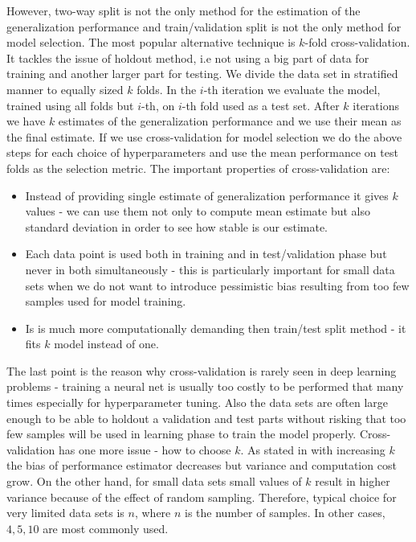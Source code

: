 \documentclass[shortabstract, english, mgr]{iithesis}
\begin{document}
However, two-way split is not the only method for the estimation of the generalization performance and train/validation split is not the only method for model selection. The most popular alternative technique is $k$-fold cross-validation. It tackles the issue of holdout method, i.e not using a big part of data for training and another larger part for testing. We divide the data set in stratified manner to equally sized $k$ folds. In the $i$-th iteration we evaluate the model, trained using all folds but $i$-th, on $i$-th fold used as a test set. After $k$ iterations we have $k$ estimates of the generalization performance and we use their mean as the final estimate. If we use cross-validation for model selection we do the above steps for each choice of hyperparameters and use the mean performance on test folds as the selection metric. The important properties of cross-validation are:
\begin{itemize}
    \item Instead of providing single estimate of generalization performance it gives $k$ values - we can use them not only to compute mean estimate but also standard deviation in order to see how stable is our estimate.
    \item Each data point is used both in training and in test/validation phase but never in both simultaneously - this is particularly important for small data sets when we do not want to introduce pessimistic bias resulting from too few samples used for model training.
    \item Is is much more computationally demanding then train/test split method - it fits $k$ model instead of one.
\end{itemize}
The last point is the reason why cross-validation is rarely seen in deep learning problems - training a neural net is usually too costly to be performed that many times especially for hyperparameter tuning. Also the data sets are often large enough to be able to holdout a validation and test parts without risking that too few samples will be used in learning phase to train the model properly. Cross-validation has one more issue - how to choose $k$. As stated in \cite{ModelSelection} with increasing $k$ the bias of performance estimator decreases but variance and computation cost grow. On the other hand, for small data sets small values of $k$ result in higher variance because of the effect of random sampling. Therefore, typical choice for very limited data sets is $n$, where $n$ is the number of samples. In other cases, $4,5,10$ are most commonly used.  
\end{document}
